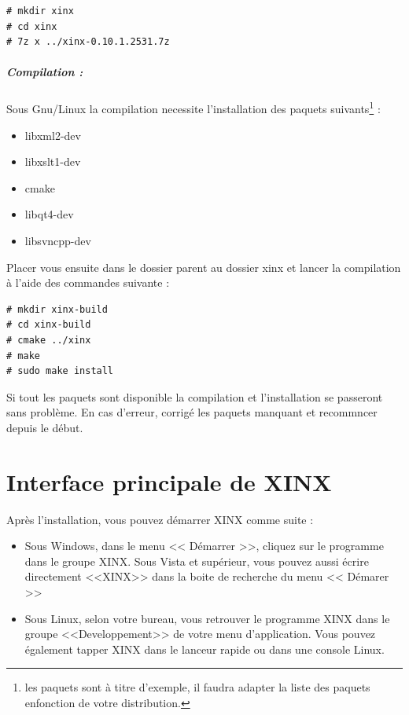 \documentclass[a4paper,10pt,twoside]{book}
\begin{document}
\begin{verbatim}
# mkdir xinx
# cd xinx
# 7z x ../xinx-0.10.1.2531.7z
\end{verbatim}

\paragraph{Compilation :}

Sous Gnu/Linux la compilation necessite l'installation des paquets suivants\footnote{les paquets sont à titre d'exemple, il faudra adapter la liste des paquets enfonction de votre distribution.} :
\begin{itemize}
 \item libxml2-dev
 \item libxslt1-dev
 \item cmake
 \item libqt4-dev
 \item libsvncpp-dev 
\end{itemize}

Placer vous ensuite dans le dossier parent au dossier xinx et lancer la compilation à l'aide des commandes suivante :
\begin{verbatim}
# mkdir xinx-build
# cd xinx-build
# cmake ../xinx
# make
# sudo make install
\end{verbatim}

Si tout les paquets sont disponible la compilation et l'installation se passeront sans problème. En cas d'erreur, corrigé les paquets manquant et recommncer depuis le début.

\chapter{Interface principale de XINX}

Après l'installation, vous pouvez démarrer XINX comme suite :
\begin{itemize}
 \item Sous Windows, dans le menu << Démarrer >>, cliquez sur le programme dans le groupe XINX. Sous Vista et supérieur, vous pouvez aussi écrire directement <<XINX>> dans la boite de recherche du menu << Démarer >>
 \item Sous Linux, selon votre bureau, vous retrouver le programme XINX dans le groupe <<Developpement>> de votre menu d'application. Vous pouvez également tapper XINX dans le lanceur rapide ou dans une console Linux. 
\end{itemize}
\end{document}
